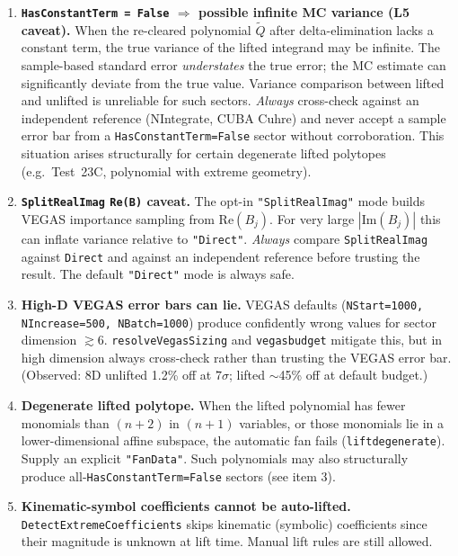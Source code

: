 \documentclass[11pt,a4paper]{article}
\begin{document}
\begin{enumerate}
\item \textbf{\texttt{HasConstantTerm = False} $\Rightarrow$ possible infinite MC variance (L5 caveat).}
When the re-cleared polynomial $\tilde{Q}$ after delta-elimination lacks a constant term, the true variance of the lifted integrand may be infinite. The sample-based standard error \emph{understates} the true error; the MC estimate can significantly deviate from the true value. Variance comparison between lifted and unlifted is unreliable for such sectors. \emph{Always} cross-check against an independent reference (NIntegrate, CUBA Cuhre) and never accept a sample error bar from a \texttt{HasConstantTerm=False} sector without corroboration. This situation arises structurally for certain degenerate lifted polytopes (e.g.\ Test~23C, polynomial with extreme geometry).

\item \textbf{\texttt{SplitRealImag} \texttt{Re(B)} caveat.}
The opt-in \texttt{"SplitRealImag"} mode builds VEGAS importance sampling from $\mathrm{Re}(B_j)$. For very large $|\mathrm{Im}(B_j)|$ this can inflate variance relative to \texttt{"Direct"}. \emph{Always} compare \texttt{SplitRealImag} against \texttt{Direct} and against an independent reference before trusting the result. The default \texttt{"Direct"} mode is always safe.

\item \textbf{High-D VEGAS error bars can lie.}
VEGAS defaults (\texttt{NStart=1000, NIncrease=500, NBatch=1000}) produce confidently wrong values for sector dimension $\gtrsim 6$. \texttt{resolveVegasSizing} and \texttt{vegasbudget} mitigate this, but in high dimension always cross-check rather than trusting the VEGAS error bar. (Observed: 8D unlifted 1.2\% off at $7\sigma$; lifted $\sim$45\% off at default budget.)

\item \textbf{Degenerate lifted polytope.}
When the lifted polynomial has fewer monomials than $(n{+}2)$ in $(n{+}1)$ variables, or those monomials lie in a lower-dimensional affine subspace, the automatic fan fails (\texttt{liftdegenerate}). Supply an explicit \texttt{"FanData"}. Such polynomials may also structurally produce all-\texttt{HasConstantTerm=False} sectors (see item 3).

\item \textbf{Kinematic-symbol coefficients cannot be auto-lifted.}
\texttt{DetectExtremeCoefficients} skips kinematic (symbolic) coefficients since their magnitude is unknown at lift time. Manual lift rules are still allowed.


\end{enumerate}
\end{document}
